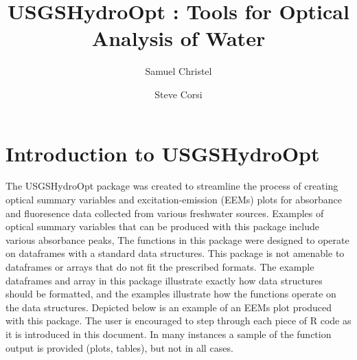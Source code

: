 \documentclass[a4paper,11pt]{article}\usepackage[]{graphicx}\usepackage[]{color}
\begin{document}
\title{USGSHydroOpt : Tools for Optical Analysis of Water}
\author[1]{Samuel Christel}
\author[1]{Steve Corsi}




\maketitle
\tableofcontents

\section{Introduction to USGSHydroOpt}
The USGSHydroOpt package was created to streamline the process of creating optical summary variables and excitation-emission (EEMs) plots for absorbance and fluoresence data collected from various freshwater sources. Examples of optical summary variables that can be produced with this package include various absorbance peaks, The functions in this package were designed to operate on dataframes with a standard data structures. This package is not amenable to dataframes or arrays that do not fit the prescribed formats. The example dataframes and array in this package illustrate exactly how data structures should be formatted, and the examples illustrate how the functions operate on the data structures. Depicted below is an example of an EEMs plot produced with this package. The user is encouraged to step through each piece of R code as it is introduced in this document. In many instances a sample of the function output is provided (plots, tables), but not in all cases.
\end{document}
